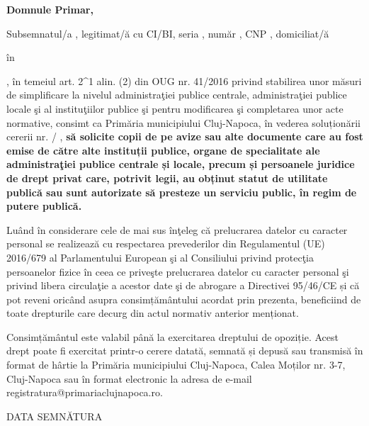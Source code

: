 \documentclass[11pt,a4paper]{article}
\newcommand{\fillline}[1][6cm]{\underline{\hspace{#1}}}
\begin{document}
\vspace*{1cm}

\begin{center}
\textbf{Domnule Primar,}
\end{center}

\vspace{1.5cm}

\hspace{0.5cm}Subsemnatul/a \fillline[7cm], legitimat/ă cu CI/BI, seria \fillline[2cm], număr \fillline[4cm], CNP \fillline[5cm], domiciliat/ă

în \fillline[14cm]

\fillline[14cm], în temeiul art. 2\textasciicircum 1 alin. (2) din OUG nr. 41/2016 privind stabilirea unor măsuri de simplificare la nivelul administraţiei publice centrale, administraţiei publice locale şi al instituţiilor publice şi pentru modificarea şi completarea unor acte normative, consimt ca Primăria municipiului Cluj-Napoca, în vederea soluționării cererii nr. \fillline[3cm] / \fillline[3cm], \textbf{să solicite copii de pe avize sau alte documente care au fost emise de către alte instituții publice, organe de specialitate ale administraţiei publice centrale și locale, precum și persoanele juridice de drept privat care, potrivit legii, au obținut statut de utilitate publică sau sunt autorizate să presteze un serviciu public, în regim de putere publică.}

\vspace{0.5cm}

\hspace{0.5cm}Luând în considerare cele de mai sus înţeleg că prelucrarea datelor cu caracter personal se realizează cu respectarea prevederilor din Regulamentul (UE) 2016/679 al Parlamentului European şi al Consiliului privind protecţia persoanelor fizice în ceea ce priveşte prelucrarea datelor cu caracter personal şi privind libera circulaţie a acestor date şi de abrogare a Directivei 95/46/CE și că pot reveni oricând asupra consimțământului acordat prin prezenta, beneficiind de toate drepturile care decurg din actul normativ anterior menționat.

\vspace{0.3cm}

\hspace{0.5cm}Consimțământul este valabil până la exercitarea dreptului de opoziție. Acest drept poate fi exercitat printr-o cerere datată, semnată și depusă sau transmisă în format de hârtie la Primăria municipiului Cluj-Napoca, Calea Moților nr. 3-7, Cluj-Napoca sau în format electronic la adresa de e-mail registratura@primariaclujnapoca.ro.

\vspace{3cm}

DATA \fillline[5cm] \hfill SEMNĂTURA \fillline[5cm]
\end{document}
